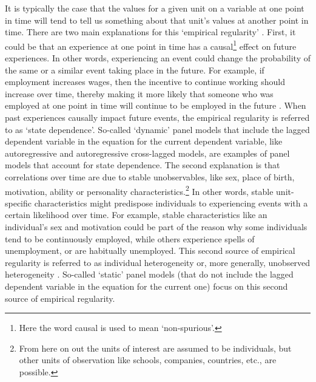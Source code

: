 \documentclass[]{interact}
\theoremstyle{plain}%
\theoremstyle{definition}
\theoremstyle{remark}
\begin{document}
It is typically the case that the values for a given unit on a variable
at one point in time will tend to tell us something about that unit's
values at another point in time. There are two main explanations for
this `empirical regularity'
\citetext{\citealp{Heckman1981}; \citealp[p.~261]{Hsiao2014}; \citealp{Bruederl2015}; \citealp{Bianconcini2018}}.
First, it could be that an experience at one point in time has a
causal\footnote{Here the word causal is used to mean `non-spurious'.}
effect on future experiences. In other words, experiencing an event
could change the probability of the same or a similar event taking place
in the future. For example, if employment increases wages, then the
incentive to continue working should increase over time, thereby making
it more likely that someone who was employed at one point in time will
continue to be employed in the future \citep{Heckman1981}. When past
experiences causally impact future events, the empirical regularity is
referred to as `state dependence'. So-called `dynamic' panel models that
include the lagged dependent variable in the equation for the current
dependent variable, like autoregressive and autoregressive cross-lagged
models, are examples of panel models that account for state dependence.
The second explanation is that correlations over time are due to stable
unobservables, like sex, place of birth, motivation, ability or
personality characteristics.\footnote{From here on out the units of
  interest are assumed to be individuals, but other units of observation
  like schools, companies, countries, etc., are possible.} In other
words, stable unit-specific characteristics might predispose individuals
to experiencing events with a certain likelihood over time. For example,
stable characteristics like an individual's sex and motivation could be
part of the reason why some individuals tend to be continuously
employed, while others experience spells of unemployment, or are
habitually unemployed. This second source of empirical regularity is
referred to as individual heterogeneity or, more generally, unobserved
heterogeneity \citep{Wooldridge2012}. So-called `static' panel models
(that do not include the lagged dependent variable in the equation for
the current one) focus on this second source of empirical regularity.
\end{document}
